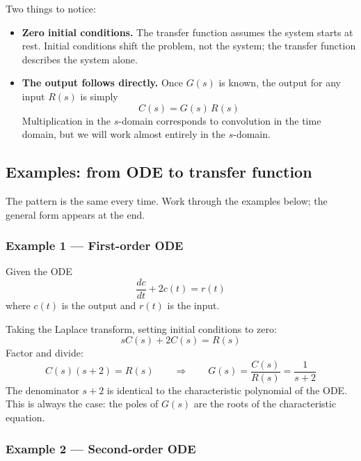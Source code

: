 \documentclass[12pt]{article}
\begin{document}
Two things to notice:
\begin{itemize}
  \item \textbf{Zero initial conditions.}  The transfer function assumes the
    system starts at rest.  Initial conditions shift the problem, not the
    system; the transfer function describes the system alone.
  \item \textbf{The output follows directly.}  Once $G(s)$ is known, the
    output for any input $R(s)$ is simply
    \begin{equation}
      C(s) = G(s)\,R(s)
      \label{eq:output_rule}
    \end{equation}
    Multiplication in the $s$-domain corresponds to convolution in the time
    domain, but we will work almost entirely in the $s$-domain.
\end{itemize}

\subsection{Examples: from ODE to transfer function}
\label{sec:tf_examples}

The pattern is the same every time.  Work through the examples below; the
general form appears at the end.

\subsubsection*{Example 1 --- First-order ODE}

Given the ODE
\begin{equation}
  \frac{dc}{dt} + 2c(t) = r(t)
  \label{eq:ex1_ode}
\end{equation}
where $c(t)$ is the output and $r(t)$ is the input.

Taking the Laplace transform, setting initial conditions to zero:
\[
  sC(s) + 2C(s) = R(s)
\]
Factor and divide:
\[
  C(s)(s + 2) = R(s)
  \qquad \Longrightarrow \qquad
  G(s) = \frac{C(s)}{R(s)} = \frac{1}{s+2}
\]
The denominator $s + 2$ is identical to the characteristic polynomial of the
ODE.  This is always the case: the poles of $G(s)$ are the roots of the
characteristic equation.

\subsubsection*{Example 2 --- Second-order ODE}
\end{document}
